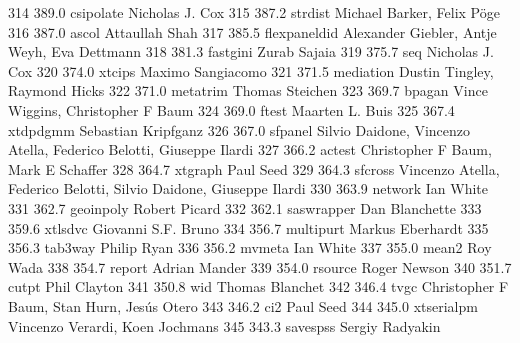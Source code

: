    314    389.0    csipolate     Nicholas J. Cox                         
   315    387.2    strdist       Michael Barker, Felix Pöge             
   316    387.0    ascol         Attaullah Shah                          
   317    385.5    flexpaneldid  Alexander Giebler, Antje Weyh, Eva      
                                   Dettmann                                
   318    381.3    fastgini      Zurab Sajaia                            
   319    375.7    seq           Nicholas J. Cox                         
   320    374.0    xtcips        Maximo Sangiacomo                       
   321    371.5    mediation     Dustin Tingley, Raymond Hicks           
   322    371.0    metatrim      Thomas Steichen                         
   323    369.7    bpagan        Vince Wiggins, Christopher F Baum       
   324    369.0    ftest         Maarten L. Buis                         
   325    367.4    xtdpdgmm      Sebastian Kripfganz                     
   326    367.0    sfpanel       Silvio Daidone, Vincenzo Atella,        
                                   Federico Belotti, Giuseppe Ilardi       
   327    366.2    actest        Christopher F Baum, Mark E Schaffer     
   328    364.7    xtgraph       Paul Seed                               
   329    364.3    sfcross       Vincenzo Atella, Federico Belotti,      
                                   Silvio Daidone, Giuseppe Ilardi         
   330    363.9    network       Ian White                               
   331    362.7    geoinpoly     Robert Picard                           
   332    362.1    saswrapper    Dan Blanchette                          
   333    359.6    xtlsdvc       Giovanni S.F. Bruno                     
   334    356.7    multipurt     Markus Eberhardt                        
   335    356.3    tab3way       Philip Ryan                             
   336    356.2    mvmeta        Ian White                               
   337    355.0    mean2         Roy Wada                                
   338    354.7    report        Adrian Mander                           
   339    354.0    rsource       Roger Newson                            
   340    351.7    cutpt         Phil Clayton                            
   341    350.8    wid           Thomas Blanchet                         
   342    346.4    tvgc          Christopher F Baum, Stan Hurn, Jesús   
                                   Otero                                   
   343    346.2    ci2           Paul Seed                               
   344    345.0    xtserialpm    Vincenzo Verardi, Koen Jochmans         
   345    343.3    savespss      Sergiy Radyakin                         
